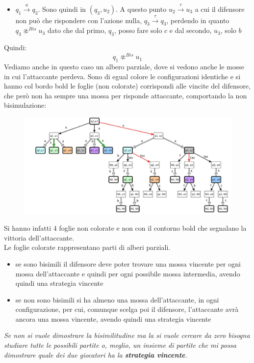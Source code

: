 \documentclass[a4paper,12pt, oneside]{book}
\begin{document}
\begin{esempio}
\begin{itemize}
    
    \item $q_1\stackrel{a}{\rightarrow}q_3$. Sono quindi in $(q_3,u_2)$. A
    questo punto $u_2\stackrel{\tau}{\rightarrow}u_3$ a cui il difensore non
    può che rispondere con l’azione nulla, $q_3\stackrel{\tau}{\rightarrow}q_3$,
    perdendo in quanto $q_3\not\approx^{Bis} u_3$ dato che dal primo, $q_3$,
    posso fare solo $c$ e dal secondo, $u_3$, solo $b$
  \end{itemize}
  Quindi:
  \[q_1\not\approx^{Bis} u_1\]
  Vediamo anche in questo caso un albero parziale, dove si vedono anche le mosse
  in cui l'attaccante perdeva. Sono di egual colore le configurazioni identiche
  e si hanno col bordo bold le foglie (non colorate) corrispondi alle vincite
  del difensore, 
  che però non ha sempre una mossa per risponde attaccante, comportando la non
  bisimulazione:
  
  \begin{figure}[H]
    \centering
    \includegraphics[scale = 0.31]{img/alb2.jpg}
  \end{figure}
  Si hanno infatti 4 foglie non colorate e non con il contorno bold che
  segnalano la vittoria dell'attaccante.\\
  Le foglie colorate rappresentano parti di alberi parziali.
\end{esempio}
\begin{itemize}
  \item se sono bisimili il difensore deve poter trovare una mossa vincente per
  ogni mossa dell'attaccante e quindi per ogni possibile mossa intermedia,
  avendo quindi una strategia vincente
  \item se non sono bisimili si ha almeno una mossa dell'attaccante, in ogni
  configurazione, per cui, comunque scelga poi il difensore, l'attaccante avrà
  ancora una mossa vincente, avendo quindi una strategia vincente
\end{itemize}
\textit{Se non si vuole dimostrare la bisimilitudine ma la si vuole cercare da
  zero bisogna studiare tutte le possibili partite o, meglio, un insieme di
  partite che mi possa dimostrare quale dei due giocatori ha la
  \textbf{strategia vincente}.}\\
\end{document}
